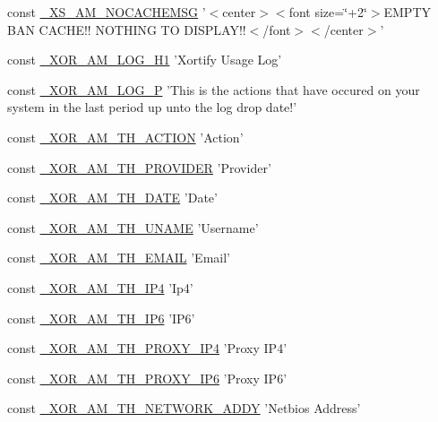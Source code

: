 \begin{DoxyCompactItemize}
\item 
const \hyperlink{admin_8php_a33ce28aaaf6456650d822a7f1ea85390}{\-\_\-\-X\-S\-\_\-\-A\-M\-\_\-\-N\-O\-C\-A\-C\-H\-E\-M\-S\-G} '$<$center$>$$<$font size=\char`\"{}+2\char`\"{}$>$E\-M\-P\-T\-Y B\-A\-N C\-A\-C\-H\-E!! N\-O\-T\-H\-I\-N\-G T\-O D\-I\-S\-P\-L\-A\-Y!!$<$/font$>$$<$/center$>$'
\item 
const \hyperlink{admin_8php_a29897cd4b39b78ac6876ecaa5ba5d963}{\-\_\-\-X\-O\-R\-\_\-\-A\-M\-\_\-\-L\-O\-G\-\_\-\-H1} 'Xortify Usage Log'
\item 
const \hyperlink{admin_8php_a2fbd3538c912bb2da9080e494d8988bf}{\-\_\-\-X\-O\-R\-\_\-\-A\-M\-\_\-\-L\-O\-G\-\_\-\-P} 'This is the actions that have occured on your system in the last period up unto the log drop date!'
\item 
const \hyperlink{admin_8php_af580055456a051476465043a8a20e8c2}{\-\_\-\-X\-O\-R\-\_\-\-A\-M\-\_\-\-T\-H\-\_\-\-A\-C\-T\-I\-O\-N} 'Action'
\item 
const \hyperlink{admin_8php_ab7d4977dc739734b4f4ff4ee6511cccb}{\-\_\-\-X\-O\-R\-\_\-\-A\-M\-\_\-\-T\-H\-\_\-\-P\-R\-O\-V\-I\-D\-E\-R} 'Provider'
\item 
const \hyperlink{admin_8php_a72fd968013399607191154b89403308c}{\-\_\-\-X\-O\-R\-\_\-\-A\-M\-\_\-\-T\-H\-\_\-\-D\-A\-T\-E} 'Date'
\item 
const \hyperlink{admin_8php_a3a9ff5904b2128321cb29d47d840f44b}{\-\_\-\-X\-O\-R\-\_\-\-A\-M\-\_\-\-T\-H\-\_\-\-U\-N\-A\-M\-E} 'Username'
\item 
const \hyperlink{admin_8php_a276072da8be36a1bb0bbb0cc167679e1}{\-\_\-\-X\-O\-R\-\_\-\-A\-M\-\_\-\-T\-H\-\_\-\-E\-M\-A\-I\-L} 'Email'
\item 
const \hyperlink{admin_8php_a1d2afdea31c70077f9e845c33e81e748}{\-\_\-\-X\-O\-R\-\_\-\-A\-M\-\_\-\-T\-H\-\_\-\-I\-P4} 'Ip4'
\item 
const \hyperlink{admin_8php_ae41a2fb1e269947bdba43d31430b13bc}{\-\_\-\-X\-O\-R\-\_\-\-A\-M\-\_\-\-T\-H\-\_\-\-I\-P6} 'I\-P6'
\item 
const \hyperlink{admin_8php_af6d9c5c52e8332b1dac37d25c742209d}{\-\_\-\-X\-O\-R\-\_\-\-A\-M\-\_\-\-T\-H\-\_\-\-P\-R\-O\-X\-Y\-\_\-\-I\-P4} 'Proxy I\-P4'
\item 
const \hyperlink{admin_8php_a5c52d492ee99a1a05f5d41813475cb7d}{\-\_\-\-X\-O\-R\-\_\-\-A\-M\-\_\-\-T\-H\-\_\-\-P\-R\-O\-X\-Y\-\_\-\-I\-P6} 'Proxy I\-P6'
\item 
const \hyperlink{admin_8php_adaa4be947d47b71f232f8cc28a7bc721}{\-\_\-\-X\-O\-R\-\_\-\-A\-M\-\_\-\-T\-H\-\_\-\-N\-E\-T\-W\-O\-R\-K\-\_\-\-A\-D\-D\-Y} 'Netbios Address'

\end{DoxyCompactItemize}
